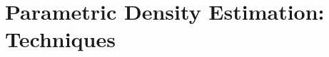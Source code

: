 \chapter{Parametric Density Estimation: Techniques}
\begin{refsection}

\printbibliography[heading=subbibliography]
\end{refsection}